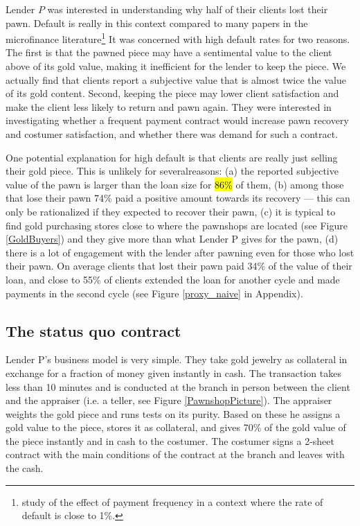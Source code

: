 \documentclass[11pt]{article}
\begin{document}
Lender $P$ was interested in understanding why half of their clients lost their pawn. Default is really in this context  compared to many papers in the microfinance literature\footnote{\cite{Pande} study of the effect of payment frequency in a context where the rate of default is close to 1\%.} It was concerned with high default rates for two reasons. The first is that the pawned piece may have a sentimental value to the client above of its gold value, making it inefficient for the lender to keep the piece. We actually find that clients report a subjective value that is almost twice the value of its gold content. Second, keeping the piece may lower client satisfaction and make the client less likely to return and pawn again. They were interested in investigating whether a frequent payment contract would increase pawn recovery and costumer satisfaction, and whether there was demand for such a contract. 

One potential explanation for high default is that clients are really just selling their gold piece. This is unlikely for severalreasons: (a)  the reported subjective value of the pawn is larger than the loan size for \hl{86\%} of them, (b) among those that lose their pawn 74\% paid a positive amount towards its recovery --- this can only be rationalized if they expected to recover their pawn, (c) it is typical to find gold purchasing stores close to where the pawnshops are located (see Figure \ref{GoldBuyers}) and they give more than what Lender P gives for the pawn, (d) there is a lot of engagement with the lender after pawning even for those who lost their pawn. On average clients that lost their pawn paid 34\% of the value of their loan, and close to 55\% of clients extended the loan for another cycle and made payments in the second cycle (see Figure \ref{proxy_naive} in Appendix).


\subsection{The status quo contract}

Lender P's business model is very simple. They take gold jewelry as collateral in exchange for a fraction of money given instantly in cash. The transaction takes less than 10 minutes and is conducted at the branch in person between the client and the appraiser (i.e. a teller, see Figure \ref{PawnshopPicture}). The appraiser weights the gold piece and runs tests on its purity. Based on these he assigns a gold value to the piece, stores it as collateral, and gives 70\% of the gold value of the piece instantly and in cash to the costumer. The costumer signs a 2-sheet contract with the main conditions of the contract at the branch and leaves with the cash.
\end{document}
